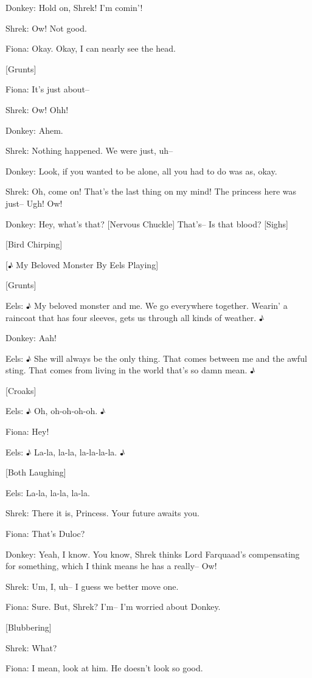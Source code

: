 \documentclass{article}
\begin{document}
Donkey:
Hold on, Shrek! I'm comin'!

Shrek:
Ow! Not good.

Fiona:
Okay. Okay, I can nearly see the head.

[Grunts]

Fiona:
It's just about--

Shrek:
Ow! Ohh!

Donkey:
Ahem.

Shrek:
Nothing happened. We were just, uh--

Donkey:
Look, if you wanted to be alone, all you had to do was as, okay.

Shrek:
Oh, come on! That's the last thing on my mind! The princess here was just-- Ugh! Ow!

Donkey:
Hey, what's that? [Nervous Chuckle] That's-- Is that blood? [Sighs]

[Bird Chirping]

[♪ My Beloved Monster By Eels Playing]

[Grunts]

Eels:
♪ My beloved monster and me. We go everywhere together. Wearin' a raincoat that has four sleeves, gets us through all kinds of weather. ♪

Donkey:
Aah!

Eels:
♪ She will always be the only thing. That comes between me and the awful sting. That comes from living in the world that's so damn mean. ♪

[Croaks]

Eels:
♪ Oh, oh-oh-oh-oh. ♪

Fiona:
Hey!

Eels:
♪ La-la, la-la, la-la-la-la. ♪

[Both Laughing]

Eels:
La-la, la-la, la-la.

Shrek:
There it is, Princess. Your future awaits you.

Fiona:
That's Duloc?

Donkey:
Yeah, I know. You know, Shrek thinks Lord Farquaad's compensating for something, which I think means he has a really-- Ow!

Shrek:
Um, I, uh-- I guess we better move one.

Fiona:
Sure. But, Shrek? I'm-- I'm worried about Donkey.

[Blubbering]

Shrek:
What?

Fiona:
I mean, look at him. He doesn't look so good.
\end{document}
